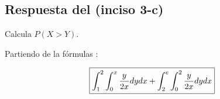 \documentclass[12pt]{article}
\begin{document}
    \subsection*{Respuesta del (inciso 3-c)} 

    \begin{flushleft}
        Calcula $P(X >Y)$.
    \end{flushleft}
    
    \begin{flushleft}
        Partiendo de la f\'ormulas :
    \end{flushleft}

    \begin{equation*}
        \fbox{$
            \displaystyle\int_{1}^{2}\int_{0}^{x}\frac{y}{2x}dy dx  + \int_{2}^{e}\int_{0}^{2}\frac{y}{2x}dy dx 
        $}
    \end{equation*}
     
\end{document}
